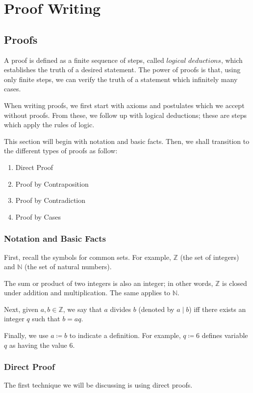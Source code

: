\documentclass[openany]{book}
\newcommand*{\defeq}{\coloneqq}
\begin{document}
\newpage


\chapter{Proof Writing}
\section{Proofs} A proof is defined as a finite sequence of steps, called $\textit{logical deductions}$, which establishes the truth of a desired statement. The power of proofs is that, using only finite steps, we can verify the truth of a statement which infinitely many cases.

When writing proofs, we first start with axioms and postulates which we accept without proofs. From these, we follow up with logical deductions; these are steps which apply the rules of logic.

This section will begin with notation and basic facts. Then, we shall transition to the different types of proofs as follow:
\begin{enumerate}
	\item Direct Proof
	\item Proof by Contraposition
	\item Proof by Contradiction
	\item Proof by Cases
\end{enumerate}

\subsection{Notation and Basic Facts} First, recall the symbols for common sets. For example, $\mathbb{Z}$ (the set of integers) and $\mathbb{N}$ (the set of natural numbers).

The sum or product of two integers is also an integer; in other words, $\mathbb{Z}$ is closed under addition and multiplication. The same applies to $\mathbb{N}$.

Next, given $a,b\in\mathbb{Z}$, we say that $a$ divides $b$ (denoted by $a \mid b$) iff there exists an integer $q$ such that $b=aq$.

Finally, we use $a \defeq b$ to indicate a definition. For example, $q \defeq 6$ defines variable $q$ as having the value $6$.

\subsection{Direct Proof} The first technique we will be discussing is using direct proofs.
\end{document}
